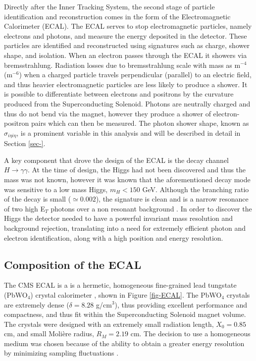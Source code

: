 Directly after the Inner Tracking System, the second stage of particle identification and reconstruction comes in the form of the Electromagnetic Calorimeter (ECAL). The ECAL serves to stop electromagnetic particles, namely electrons and photons, and measure the energy deposited in the detector. These particles are identified and reconstructed using signatures such as charge, shower shape, and isolation. When an electron passes through the ECAL it showers via bremsstrahlung. Radiation losses due to bremsstrahlung scale with mass as m$^{-4}$ (m$^{-6}$) when a charged particle travels perpendicular (parallel) to an electric field, and thus heavier electromagnetic particles are less likely to produce a shower. It is possible to differentiate between electrons and positrons by the curvature produced from the Superconducting Solenoid. Photons are neutrally charged and thus do not bend via the magnet, however they produce a shower of electron-positron pairs which can then be measured. The photon shower shape, known as $\sigma_{i\eta i\eta}$, is a prominent variable in this analysis and will be described in detail in Section \ref{sec-}.  

A key component that drove the design of the ECAL is the decay channel $H \to \gamma\gamma$. At the time of design, the Higgs had not been discovered and thus the mass was not known, however it was known that the aforementioned decay mode was sensitive to a low mass Higgs, $m_H<150$ GeV. Although the branching ratio of the decay is small ($\simeq0.002$), the signature is clean and is a narrow resonance of two high E$_T$ photons over a non resonant background \cite{HiggsProposal}. In order to discover the Higgs the detector needed to have a powerful invariant mass resolution and background rejection, translating into a need for extremely efficient photon and electron identification, along with a high position and energy resolution. 

\subsection{Composition of the ECAL} \label{subsec-ECALComposition}

The CMS ECAL is a is a hermetic, homogeneous fine-grained lead tungstate (PbWO$_4$) crystal calorimeter \cite{ECAL}, shown in Figure \ref{fig-ECAL}. The PbWO$_4$ crystals are extremely dense  ($\delta=8.28$ g/cm$^3$), thus providing excellent performance and compactness, and thus fit within the Superconducting Solenoid magnet volume. The crystals were designed with an extremely small radiation length, $X_0=0.85$ cm, and small Moli\`{e}re radius, $R_M=2.19$ cm. The decision to use a homogeneous medium was chosen because of the ability to obtain a greater energy resolution by minimizing sampling fluctuations \cite{ECAL}. 

